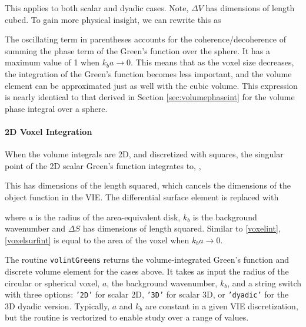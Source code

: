 This applies to both scalar and dyadic cases. Note, $\Delta V$ has dimensions of length cubed. To gain more physical insight, we can rewrite this as

The oscillating term in parentheses accounts for the coherence/decoherence of summing the phase term of the Green's function over the sphere. It has a maximum value of 1 when $k_b a \rightarrow 0$. This means that as the voxel size decreases, the integration of the Green's function becomes less important, and the volume element can be approximated just as well with the cubic volume. This expression is nearly identical to that derived in Section \ref{sec:volumephaseint} for the volume phase integral over a sphere.



\paragraph{2D Voxel Integration}
When the volume integrals are 2D, and discretized with squares, the singular point of the 2D scalar Green's function integrates to, \cite{gao2005analytical},

This has dimensions of the length squared, which cancels the dimensions of the object function in the VIE. The differential surface element is replaced with

\noindent where $a$ is the radius of the area-equivalent disk, $k_b$ is the background wavenumber and $\Delta S$ has dimensions of length squared. Similar to \eqref{voxelint}, \eqref{voxelsurfint} is equal to the area of the voxel when $k_b a \rightarrow 0$.

The routine \texttt{volintGreens} returns the volume-integrated Green's function and discrete volume element for the cases above. It takes as input the radius of the circular or spherical voxel, $a$, the background wavenumber, $k_b$, and a string switch with three options: \texttt{'2D'} for scalar 2D, \texttt{'3D'} for scalar 3D, or \texttt{'dyadic'} for the 3D dyadic version. Typically, $a$ and $k_b$ are constant in a given VIE discretization, but the routine is vectorized to enable study over a range of values.

